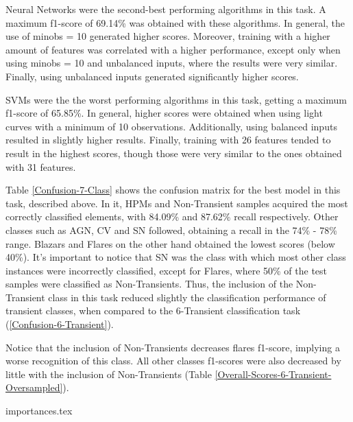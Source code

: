 \documentclass[a4paper,fleqn,usenatbib]{mnras}
\begin{document}
Neural Networks were the second-best performing algorithms in this task. A maximum f1-score of 69.14\% was obtained with these algorithms. In general, the use of min\textunderscore obs = 10 generated higher scores. Moreover, training with a higher amount of features was correlated with a higher performance, except only when using min\textunderscore obs = 10 and unbalanced inputs, where the results were very similar. Finally, using unbalanced inputs generated significantly higher scores.

SVMs were the the worst performing algorithms in this task, getting a maximum f1-score of 65.85\%. In general, higher scores were obtained when using light curves with a minimum of 10 observations. Additionally, using balanced inputs resulted in slightly higher results. Finally, training with 26 features tended to result in the highest scores, though those were very similar to the ones obtained with 31 features.

Table \ref{Confusion-7-Class} shows the confusion matrix for the best model in this task, described above. In it, HPMs and Non-Transient samples acquired the most correctly classified elements, with 84.09\% and 87.62\% recall respectively. Other classes such as AGN, CV and SN followed, obtaining a recall in the 74\% - 78\% range. Blazars and Flares on the other hand obtained the lowest scores (below 40\%). It's important to notice that SN was the class with which most other class instances were incorrectly classified, except for Flares, where 50\% of the test samples were classified as Non-Transients. Thus, the inclusion of the Non-Transient class in this task reduced slightly the classification performance of transient classes, when compared to the 6-Transient classification task (\ref{Confusion-6-Transient}).

Notice that the inclusion of Non-Transients decreases flares f1-score, implying a worse recognition of this class. All other classes f1-scores were also decreased by little with the inclusion of Non-Transients (Table \ref{Overall-Scores-6-Transient-Oversampled}).


{importances.tex}
\end{document}
